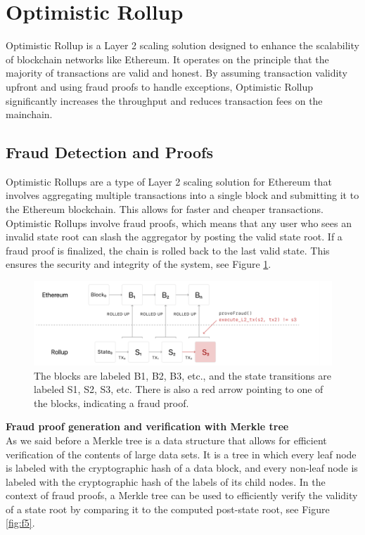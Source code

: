 \documentclass{report}
\begin{document}
\section{Optimistic Rollup}
Optimistic Rollup is a Layer 2 scaling solution designed to enhance the scalability of blockchain networks like Ethereum. It operates on the principle that the majority of transactions are valid and honest. By assuming transaction validity upfront and using fraud proofs to handle exceptions, Optimistic Rollup significantly increases the throughput and reduces transaction fees on the mainchain.
\subsection{Fraud Detection and Proofs}
Optimistic Rollups are a type of Layer 2 scaling solution for Ethereum that involves aggregating multiple transactions into a single block and submitting it to the Ethereum blockchain. This allows for faster and cheaper transactions.\\
Optimistic Rollups involve fraud proofs, which means that any user who sees an invalid state root can slash the aggregator by posting the valid state root. If a fraud proof is finalized, the chain is rolled back to the last valid state. This ensures the security and integrity of the system, see Figure \ref{fig:f4}.\\
\begin{center}
	\begin{figure}
		\centering
		\includegraphics[width=0.8\linewidth]{Fig/F4}
		\caption{The blocks are labeled B1, B2, B3, etc., and the state transitions are labeled S1, S2, S3, etc. There is also a red arrow pointing to one of the blocks, indicating a fraud proof.
		}
		\label{fig:f4}
	\end{figure}
\end{center}
\textbf{Fraud proof generation and verification with Merkle tree}\\ As we said before a Merkle tree is a data structure that allows for efficient verification of the contents of large data sets. It is a tree in which every leaf node is labeled with the cryptographic hash of a data block, and every non-leaf node is labeled with the cryptographic hash of the labels of its child nodes. In the context of fraud proofs, a Merkle tree can be used to efficiently verify the validity of a state root by comparing it to the computed post-state root, see Figure \ref{fig:f5}.
\end{document}

